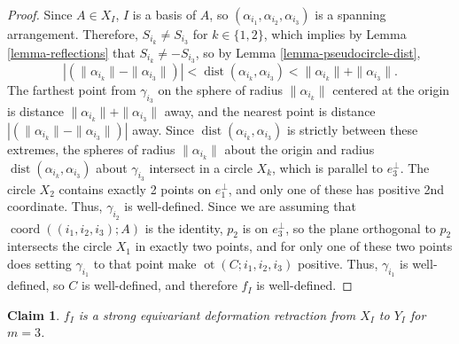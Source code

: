 \documentclass[JEP,XML,SOM,Unicode,NoFloatCountersInSection,published]{cedram}
\newtheorem{claim}[theorem]{Claim}
\theoremstyle{remark}
\DeclareMathOperator{\dist}{dist}
\DeclareMathOperator{\coord}{coord}
\DeclareMathOperator{\ot}{ot}
\begin{document}
\begin{proof}
Since $A \in X_I$, $I$ is a basis of $A$, so $(\alpha_{i_1},\alpha_{i_2},\alpha_{i_3})$ is a spanning arrangement. Therefore, $S_{i_k} \neq S_{i_3}$ for $k \in \{1,2\}$, which implies by Lemma \ref{lemma-reflections} that $S_{i_k} \neq -S_{i_3}$, so by Lemma \ref{lemma-pseudocircle-dist},
\[ |(\|\alpha_{i_k}\| - \|\alpha_{i_3}\|)| < \dist(\alpha_{i_k},\alpha_{i_3}) < \|\alpha_{i_k}\| +\|\alpha_{i_3}\|. \]
The farthest point from $\gamma_{i_3}$ on the sphere of radius $\|\alpha_{i_k}\|$ centered at the origin is distance $\|\alpha_{i_k}\| +\|\alpha_{i_3}\|$ away, and the nearest point is distance $|(\|\alpha_{i_k}\| - \|\alpha_{i_3}\|)|$ away. Since $\dist(\alpha_{i_k},\alpha_{i_3})$ is strictly between these extremes, the spheres of radius $\|\alpha_{i_k}\|$ about the origin and radius $\dist(\alpha_{i_k},\alpha_{i_3})$ about $\gamma_{i_3}$ intersect in a circle $X_k$, which is parallel to $e_3^\bot$.
The circle $X_2$ contains exactly 2 points on $e_1^\bot$, and only one of these has positive 2nd coordinate.
Thus, $\gamma_{i_2}$ is well-defined.
Since we are assuming that $\coord((i_1,i_2,i_3);A)$ is the identity,
$p_2$ is on $e_3^\bot$, so the plane orthogonal to $p_2$ intersects the circle $X_1$ in exactly two points, and for only one of these two points does setting $\gamma_{i_1}$ to that point make $\ot(C;i_1,i_2,i_3)$ positive.
Thus, $\gamma_{i_1}$ is well-defined, so $C$ is well-defined, and therefore $f_I$ is well-defined.
\end{proof}

\begin{claim}\label{claim-deform-f3}
$f_I$ is a strong equivariant deformation retraction from $X_I$ to $Y_I$ for $m=3$.
\end{claim}
\end{document}
